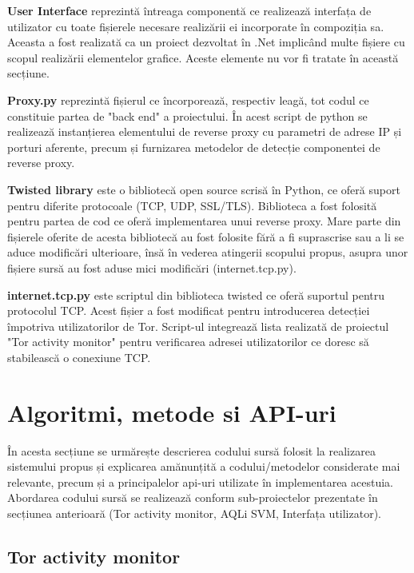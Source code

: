 \textbf{User Interface}  reprezintă întreaga componentă ce realizează interfața de utilizator cu toate fișierele necesare realizării ei incorporate în compoziția sa. Aceasta a fost realizată ca un proiect dezvoltat în .Net implicând multe fișiere cu scopul realizării elementelor grafice. Aceste elemente nu vor fi tratate în această secțiune. 

\textbf{Proxy.py}  reprezintă fișierul ce încorporează, respectiv leagă, tot codul ce constituie partea de "back end" a proiectului. În acest script de python se realizează instanțierea elementului de reverse proxy cu parametri de adrese IP și porturi aferente, precum și furnizarea metodelor de detecție componentei de reverse proxy. 

\textbf{Twisted library}  este o bibliotecă open source scrisă în Python, ce oferă suport pentru diferite protocoale (TCP, UDP, SSL/TLS). Biblioteca a fost folosită pentru partea de cod ce oferă implementarea unui reverse proxy. Mare parte din fișierele oferite de acesta bibliotecă au fost folosite fără a fi suprascrise sau a li se aduce modificări ulterioare, însă în vederea atingerii scopului propus, asupra unor fișiere sursă au fost aduse mici modificări (internet.tcp.py).

\textbf{internet.tcp.py} este scriptul din biblioteca twisted ce oferă suportul pentru protocolul TCP. Acest fișier a fost modificat pentru introducerea detecției împotriva utilizatorilor de Tor. Script-ul integrează lista realizată de proiectul "Tor activity monitor" pentru verificarea adresei utilizatorilor ce doresc să stabilească o conexiune TCP. 




\section{Algoritmi, metode si API-uri}

În acesta secțiune se urmărește descrierea codului sursă folosit la realizarea sistemului propus și explicarea amănunțită a codului/metodelor considerate mai relevante, precum și a principalelor api-uri utilizate în implementarea acestuia. Abordarea codului sursă se realizează conform sub-proiectelor prezentate în secțiunea anterioară (Tor activity monitor, AQLi SVM, Interfața utilizator). 

\subsection{Tor activity monitor}

